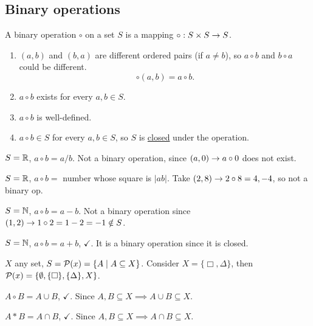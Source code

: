 \documentclass[]{article}
\begin{document}
\subsection{Binary operations}

\begin{definition}
	A binary operation $\circ$ on a set $S$ is a mapping $\circ:S\times S\rightarrow S$.
	\begin{enumerate}
		\item $(a,b)$ and $(b,a)$ are different ordered pairs (if $a\neq b$), so $a\circ b$ and $b\circ a$ could be different. $$\circ(a,b) = a\circ b.$$
		\item $a\circ b$ exists for every $a,b\in S$.
		\item $a\circ b$ is well-defined.
		\item $a\circ b\in S$ for every $a,b\in S$, so $S$ is \ul{closed} under the operation.
	\end{enumerate}
\end{definition}
\begin{example}
	$S = \mathbb{R}$, $a\circ b = a/b$. Not a binary operation, since $(a,0)\rightarrow a\circ 0$ does not exist.
\end{example}
\begin{example}
	$S = \mathbb{R}$, $a\circ b = $ number whose square is $|ab|$. Take $(2,8) \rightarrow 2\circ 8 = 4,-4$, so not a binary op.
\end{example}
\begin{example}
	$S = \mathbb{N}$, $a\circ b = a-b$. Not a binary operation since $(1,2)\rightarrow 1\circ 2=1-2 = -1\notin S$.
\end{example}
\begin{example}
	$S = \mathbb{N}$, $a\circ b = a+b$, $\checkmark$. It is a binary operation since it is closed.
\end{example}
\begin{example}
	$X$ any set, $S = \mathcal{P}(x) = \{A\mid A\subseteq X\}$. Consider $X = \{\Box,\Delta\}$, then $\mathcal{P}(x) = \{\emptyset,\{\Box\},\{\Delta\},X\}$.
\end{example}
\begin{example}
	$A\circ B = A\cup B$, $\checkmark$. Since $A,B\subseteq X \implies A\cup B \subseteq X$.

	$A*B = A\cap B$, $\checkmark$. Since $A,B\subseteq X \implies A\cap B\subseteq X$.
\end{example}
\end{document}
